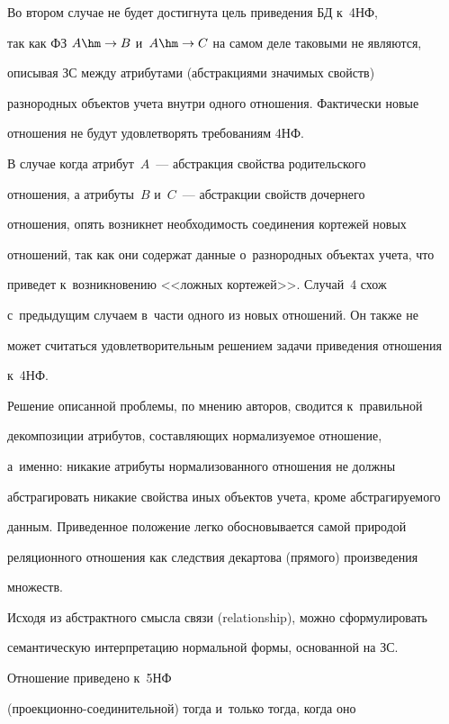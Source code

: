   

  Во втором случае не будет достигнута цель приведения БД к~4НФ, 

так как ФЗ $A\hm\to B$ и~$A\hm\to C$ на самом деле таковыми не являются, 

описывая ЗС между атрибутами (абстракциями значимых свойств) 

разнородных объектов учета внут\-ри одного отношения. Фактически новые 

отношения не будут удовле\-тво\-рять требованиям 4НФ.

  

  В случае когда атрибут~$A$~--- абстракция свойства родительского 

отношения, а атрибуты~$B$ и~$C$~--- абстракции свойств дочернего 

отношения, опять возникнет необходимость соединения кортежей новых 

отношений, так как они содержат данные о~разнородных объектах учета, что 

приведет к~возникновению <<лож\-ных кортежей>>. Случай~4 схож 

с~предыду\-щим случаем в~час\-ти одного из новых отношений. Он также не 

может считаться удовлетворительным решением задачи приведения отношения 

к~4НФ.

  

  Решение описанной проблемы, по мнению авторов, сводится к~правильной 

декомпозиции атрибутов, со\-став\-ля\-ющих нор\-ма\-ли\-зу\-емое отношение,

а~именно: никакие атрибуты нормализованного отношения не должны 

абстрагировать никакие свойства иных объектов учета, кроме абстрагируемого 

данным. Приведенное положение легко обосновывается самой природой 

реляционного отношения как следствия декартова (прямого) произведения 

множеств.

  

Исходя из абстрактного смысла связи (relationship), можно сформулировать 

семантическую интерпретацию нормальной формы, основанной на ЗС. 

Отношение приведено к~5НФ  

(про\-ек\-ци\-он\-но-со\-еди\-ни\-тель\-ной) тогда и~только тогда, когда оно 

